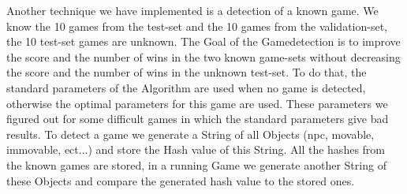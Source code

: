   Another technique we have implemented is a detection of a known game. We know the 10 games from the test-set and the 10 games from the validation-set, the 10 test-set games are unknown. The Goal of the Gamedetection is to improve the score and the number of wins in the two known game-sets without decreasing the score and the number of wins in the unknown test-set. To do that, the standard parameters of the Algorithm are used when no game is detected, otherwise the optimal parameters for this game are used. These parameters we figured out for some difficult games in which the standard parameters give bad results. To detect a game we generate a String of all Objects (npc, movable, immovable, ect...) and store the Hash value of this String. All the hashes from the known games are stored, in a running Game we generate another String of these Objects and compare the generated hash value to the stored ones. 